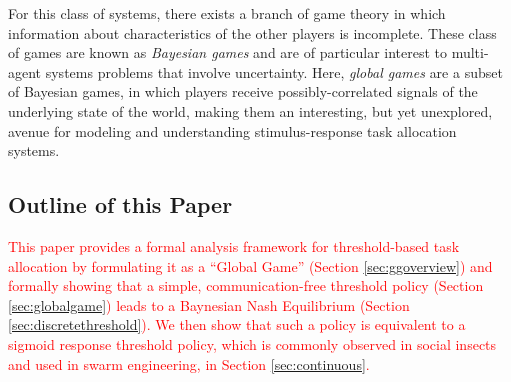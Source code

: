 \documentclass[smallextended]{svjour3}       %
\newcommand{\edit}[1]{\textcolor{red}{#1}}
\begin{document}
For this class of systems, there exists a branch of game theory in which information about characteristics of the other players is incomplete. These class of games are known as \emph{Bayesian games} \citep{harsanyi2004games} and are of particular interest to multi-agent systems problems that involve uncertainty. Here, \emph{global games} \citep{Carlsson1993} are a subset of Bayesian games, in which players receive possibly-correlated signals of the underlying state of the world, making them an interesting, but yet unexplored, avenue for modeling and understanding stimulus-response task allocation systems. 

\subsection{Outline of this Paper}
\edit{This paper provides a formal analysis framework for threshold-based task allocation by formulating it as a ``Global Game'' (Section \ref{sec:ggoverview}) and formally showing that a simple, communication-free threshold policy (Section \ref{sec:globalgame}) leads to a Baynesian Nash Equilibrium (Section \ref{sec:discretethreshold}). We then show that such a policy is equivalent to a sigmoid response threshold policy, which is commonly observed in social insects and used in swarm engineering, in Section \ref{sec:continuous}.}

\end{document}
